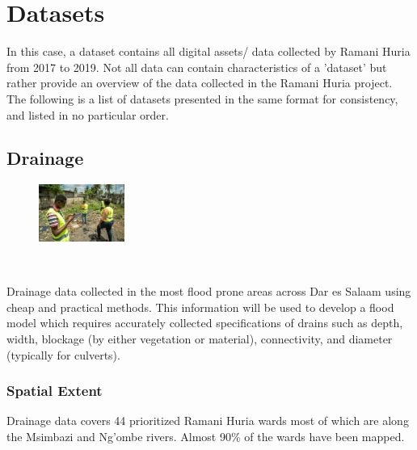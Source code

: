 \documentclass[a4paper,12pt,twoside]{article}
\begin{document}
\newpage
\section{Datasets}
In this case, a dataset contains all digital assets/ data collected by Ramani Huria from 2017 to 2019. Not all data can contain characteristics of a 'dataset' but rather provide an overview of the data collected in the Ramani Huria project.%
The following is a list of datasets presented in the same format for consistency, and listed in no particular order.%
\subsection{Drainage}
\begin{figure} %
    \centering
    \includegraphics[width=0.25\textwidth]{images/Drainage_Mapping.jpg}
\end{figure}

\

Drainage data collected in the most flood prone areas across Dar es Salaam using cheap  and practical methods. This information will be used to develop a flood model which requires accurately collected specifications of drains such as depth, width, blockage (by either vegetation or material), connectivity, and diameter (typically for culverts).

\subsubsection{Spatial Extent}
Drainage data covers 44 prioritized Ramani Huria wards most of which are along the Msimbazi and Ng’ombe rivers. Almost 90\% of the wards have been mapped.
\end{document}
